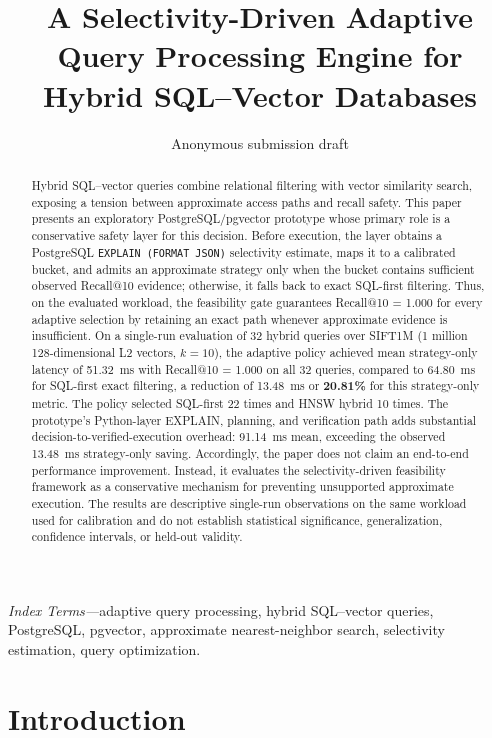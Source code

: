\documentclass[10pt,twocolumn]{article}
\title{A Selectivity-Driven Adaptive Query Processing Engine for Hybrid SQL--Vector Databases}
\author{Anonymous submission draft}
\date{}
\begin{document}
\maketitle

\begin{abstract}
Hybrid SQL--vector queries combine relational filtering with vector similarity search, exposing a tension between approximate access paths and recall safety. This paper presents an exploratory PostgreSQL/pgvector prototype whose primary role is a conservative safety layer for this decision. Before execution, the layer obtains a PostgreSQL \texttt{EXPLAIN (FORMAT JSON)} selectivity estimate, maps it to a calibrated bucket, and admits an approximate strategy only when the bucket contains sufficient observed Recall@10 evidence; otherwise, it falls back to exact SQL-first filtering. Thus, on the evaluated workload, the feasibility gate guarantees Recall@10 = 1.000 for every adaptive selection by retaining an exact path whenever approximate evidence is insufficient. On a single-run evaluation of 32 hybrid queries over SIFT1M (1 million 128-dimensional L2 vectors, $k=10$), the adaptive policy achieved mean strategy-only latency of 51.32~ms with Recall@10 = 1.000 on all 32 queries, compared to 64.80~ms for SQL-first exact filtering, a reduction of 13.48~ms or \textbf{20.81\%} for this strategy-only metric. The policy selected SQL-first 22 times and HNSW hybrid 10 times. The prototype's Python-layer EXPLAIN, planning, and verification path adds substantial decision-to-verified-execution overhead: 91.14~ms mean, exceeding the observed 13.48~ms strategy-only saving. Accordingly, the paper does not claim an end-to-end performance improvement. Instead, it evaluates the selectivity-driven feasibility framework as a conservative mechanism for preventing unsupported approximate execution. The results are descriptive single-run observations on the same workload used for calibration and do not establish statistical significance, generalization, confidence intervals, or held-out validity.
\end{abstract}

\noindent\textit{Index Terms---}adaptive query processing, hybrid SQL--vector queries, PostgreSQL, pgvector, approximate nearest-neighbor search, selectivity estimation, query optimization.

\section{Introduction}
\label{sec:intro}
\end{document}
